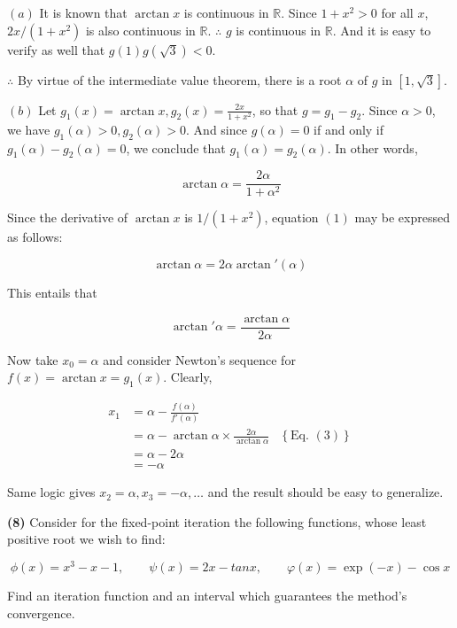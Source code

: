 \documentclass[12pt]{article}
\theoremstyle{definition}
\begin{document}
$(a)$ It is known that $\arctan x$ is continuous in $\mathbb{R}$. Since $1 + x^2 >
0$ for all $x$, $2x / (1+x^2)$ is also continuous in $\mathbb{R}$. $\therefore $
$g$ is continuous in $\mathbb{R}$. And it is easy to verify as well that
$g(1)g(\sqrt{3} ) < 0$. 

$\therefore $ By virtue of the intermediate value theorem, there is a root
$\alpha$ of $g$ in $[1, \sqrt{3}] $.

$(b)$ Let $g_1(x) = \arctan x, g_2(x) = \frac{2x}{1+x^2}$, so that $g = g_1 -
g_2$. Since $\alpha > 0$, we have $g_1(\alpha) > 0, g_2(\alpha) > 0$. And since
$g(\alpha) = 0$ if and only if $g_1(\alpha) - g_2(\alpha) = 0$, we conclude that 
$g_1(\alpha) = g_2(\alpha)$. In other words, 

\begin{equation}
    \arctan \alpha = \frac{2\alpha}{1+\alpha^2}
\end{equation}

Since the derivative of $\arctan x$ is $1 / (1+x^2)$, equation $(1)$ may be
expressed as follows: 

\begin{equation}
    \arctan \alpha = 2\alpha \arctan'(\alpha)
\end{equation}

This entails that 

\begin{equation}
    \arctan' \alpha = \frac{\arctan \alpha}{2\alpha}
\end{equation}

Now take $x_0 = \alpha$ and consider Newton's sequence for $f(x) = \arctan x =
g_1(x)$. Clearly,

\begin{align*}
    x_1 
    &= \alpha - \frac{f(\alpha)}{f'(\alpha)} \\ 
    &= \alpha - \arctan \alpha \times \frac{2\alpha}{\arctan \alpha} &\left\{
    \text{Eq. } (3) \right\}  \\ 
    &= \alpha - 2\alpha \\ 
    &=-\alpha
\end{align*}

Same logic gives $x_2 = \alpha, x_3 = -\alpha, \ldots$ and the result should be
easy to generalize.

\pagebreak 

\begin{shaded}
    \textbf{(8)} Consider  for the fixed-point iteration the following
    functions, whose least positive root we wish to find:

    \begin{equation*}
        \phi(x) = x^3 - x - 1,\qquad \psi(x) = 2x - tan x, \qquad \varphi(x) = \exp(-x) -
        \cos x
    \end{equation*}

    Find an iteration function and an interval which guarantees the method's
    convergence.
\end{shaded}
\end{document}
